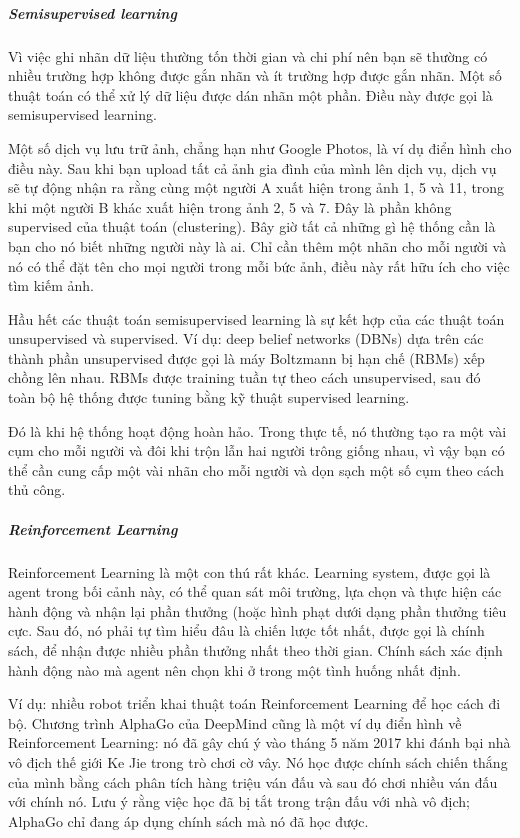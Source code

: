 \subparagraph{Semisupervised learning}

Vì việc ghi nhãn dữ liệu thường tốn thời gian và chi phí nên bạn sẽ thường có nhiều trường hợp không được gắn nhãn và ít trường hợp được gắn nhãn. Một số thuật toán có thể xử lý dữ liệu được dán nhãn một phần. Điều này được gọi là semisupervised learning.

Một số dịch vụ lưu trữ ảnh, chẳng hạn như Google Photos, là ví dụ điển hình cho điều này. Sau khi bạn upload tất cả ảnh gia đình của mình lên dịch vụ, dịch vụ sẽ tự động nhận ra rằng cùng một người A xuất hiện trong ảnh 1, 5 và 11, trong khi một người B khác xuất hiện trong ảnh 2, 5 và 7. Đây là phần không supervised của thuật toán (clustering). Bây giờ tất cả những gì hệ thống cần là bạn cho nó biết những người này là ai. Chỉ cần thêm một nhãn cho mỗi người và nó có thể đặt tên cho mọi người trong mỗi bức ảnh, điều này rất hữu ích cho việc tìm kiếm ảnh.

Hầu hết các thuật toán semisupervised learning là sự kết hợp của các thuật toán unsupervised và supervised. Ví dụ: deep belief networks (DBNs) dựa trên các thành phần unsupervised được gọi là máy Boltzmann bị hạn chế (RBMs) xếp chồng lên nhau. RBMs được training tuần tự theo cách unsupervised, sau đó toàn bộ hệ thống được tuning bằng kỹ thuật supervised learning.

Đó là khi hệ thống hoạt động hoàn hảo. Trong thực tế, nó thường tạo ra một vài cụm cho mỗi người và đôi khi trộn lẫn hai người trông giống nhau, vì vậy bạn có thể cần cung cấp một vài nhãn cho mỗi người và dọn sạch một số cụm theo cách thủ công.

\subparagraph{Reinforcement Learning}

Reinforcement Learning là một con thú rất khác. Learning system, được gọi là agent trong bối cảnh này, có thể quan sát môi trường, lựa chọn và thực hiện các hành động và nhận lại phần thưởng (hoặc hình phạt dưới dạng phần thưởng tiêu cực. Sau đó, nó phải tự tìm hiểu đâu là chiến lược tốt nhất, được gọi là chính sách, để nhận được nhiều phần thưởng nhất theo thời gian. Chính sách xác định hành động nào mà agent nên chọn khi ở trong một tình huống nhất định.

Ví dụ: nhiều robot triển khai thuật toán Reinforcement Learning để học cách đi bộ. Chương trình AlphaGo của DeepMind cũng là một ví dụ điển hình về Reinforcement Learning: nó đã gây chú ý vào tháng 5 năm 2017 khi đánh bại nhà vô địch thế giới Ke Jie trong trò chơi cờ vây. Nó học được chính sách chiến thắng của mình bằng cách phân tích hàng triệu ván đấu và sau đó chơi nhiều ván đấu với chính nó. Lưu ý rằng việc học đã bị tắt trong trận đấu với nhà vô địch; AlphaGo chỉ đang áp dụng chính sách mà nó đã học được.

